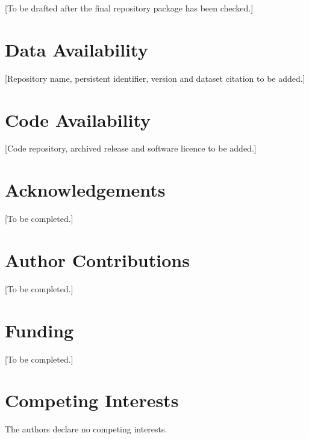 \documentclass[pdflatex,sn-mathphys-num]{sn-jnl}
\begin{document}
[To be drafted after the final repository package has been checked.]

\section{Data Availability}\label{sec:data-availability}

[Repository name, persistent identifier, version and dataset citation to be added.]

\section{Code Availability}\label{sec:code-availability}

[Code repository, archived release and software licence to be added.]

\section*{Acknowledgements}

[To be completed.]

\section*{Author Contributions}

[To be completed.]

\section*{Funding}

[To be completed.]

\section*{Competing Interests}

The authors declare no competing interests.

\backmatter


\end{document}

